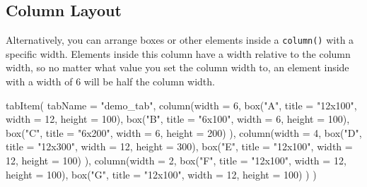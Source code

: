 \documentclass[
  oneside]{book}
\newenvironment{Shaded}{\begin{snugshade}}{\end{snugshade}}
\newcommand{\AttributeTok}[1]{\textcolor[rgb]{0.77,0.63,0.00}{#1}}
\newcommand{\DecValTok}[1]{\textcolor[rgb]{0.00,0.00,0.81}{#1}}
\newcommand{\FunctionTok}[1]{\textcolor[rgb]{0.00,0.00,0.00}{#1}}
\newcommand{\NormalTok}[1]{#1}
\newcommand{\StringTok}[1]{\textcolor[rgb]{0.31,0.60,0.02}{#1}}
\begin{document}
\hypertarget{column-layout}{%
\subsection{Column Layout}\label{column-layout}}

Alternatively, you can arrange boxes or other elements inside a \texttt{column}\texttt{()} with a specific \AttributeTok{width}. Elements inside this column have a width relative to the column width, so no matter what value you set the column \AttributeTok{width} to, an element inside with a \AttributeTok{width} of \DecValTok{6} will be half the column width.

\begin{Shaded}
\begin{Highlighting}[]
\FunctionTok{tabItem}\NormalTok{(}
    \AttributeTok{tabName =} \StringTok{"demo\_tab"}\NormalTok{,}
    \FunctionTok{column}\NormalTok{(}\AttributeTok{width =} \DecValTok{6}\NormalTok{,}
        \FunctionTok{box}\NormalTok{(}\StringTok{"A"}\NormalTok{, }\AttributeTok{title =} \StringTok{"12x100"}\NormalTok{, }\AttributeTok{width =} \DecValTok{12}\NormalTok{, }\AttributeTok{height =} \DecValTok{100}\NormalTok{),}
        \FunctionTok{box}\NormalTok{(}\StringTok{"B"}\NormalTok{, }\AttributeTok{title =} \StringTok{"6x100"}\NormalTok{, }\AttributeTok{width =} \DecValTok{6}\NormalTok{, }\AttributeTok{height =} \DecValTok{100}\NormalTok{),}
        \FunctionTok{box}\NormalTok{(}\StringTok{"C"}\NormalTok{, }\AttributeTok{title =} \StringTok{"6x200"}\NormalTok{, }\AttributeTok{width =} \DecValTok{6}\NormalTok{, }\AttributeTok{height =} \DecValTok{200}\NormalTok{)}
\NormalTok{    ), }
    \FunctionTok{column}\NormalTok{(}\AttributeTok{width =} \DecValTok{4}\NormalTok{,}
        \FunctionTok{box}\NormalTok{(}\StringTok{"D"}\NormalTok{, }\AttributeTok{title =} \StringTok{"12x300"}\NormalTok{, }\AttributeTok{width =} \DecValTok{12}\NormalTok{, }\AttributeTok{height =} \DecValTok{300}\NormalTok{),}
        \FunctionTok{box}\NormalTok{(}\StringTok{"E"}\NormalTok{, }\AttributeTok{title =} \StringTok{"12x100"}\NormalTok{, }\AttributeTok{width =} \DecValTok{12}\NormalTok{, }\AttributeTok{height =} \DecValTok{100}\NormalTok{)}
\NormalTok{    ),}
    \FunctionTok{column}\NormalTok{(}\AttributeTok{width =} \DecValTok{2}\NormalTok{,}
        \FunctionTok{box}\NormalTok{(}\StringTok{"F"}\NormalTok{, }\AttributeTok{title =} \StringTok{"12x100"}\NormalTok{, }\AttributeTok{width =} \DecValTok{12}\NormalTok{, }\AttributeTok{height =} \DecValTok{100}\NormalTok{),}
        \FunctionTok{box}\NormalTok{(}\StringTok{"G"}\NormalTok{, }\AttributeTok{title =} \StringTok{"12x100"}\NormalTok{, }\AttributeTok{width =} \DecValTok{12}\NormalTok{, }\AttributeTok{height =} \DecValTok{100}\NormalTok{)}
\NormalTok{    )}
\NormalTok{)}
\end{Highlighting}
\end{Shaded}
\end{document}
